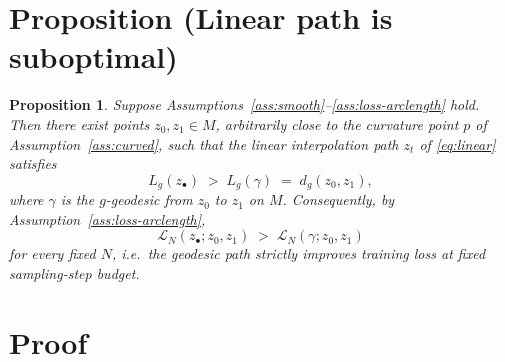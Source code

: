 \documentclass[11pt]{article}
\newtheorem{proposition}{Proposition}
\begin{document}
\section*{Proposition (Linear path is suboptimal)}

\begin{proposition}\label{prop:main}
Suppose Assumptions~\ref{ass:smooth}--\ref{ass:loss-arclength} hold.
Then there exist points $z_0, z_1 \in M$, arbitrarily close to the
curvature point $p$ of Assumption~\ref{ass:curved}, such that the
linear interpolation path $z_t$ of \eqref{eq:linear} satisfies
\begin{equation}\label{eq:strict-arc}
  L_g(z_\bullet) \;>\; L_g(\gamma) \;=\; d_g(z_0, z_1),
\end{equation}
where $\gamma$ is the $g$-geodesic from $z_0$ to $z_1$ on $M$.
Consequently, by Assumption~\ref{ass:loss-arclength},
\begin{equation}\label{eq:strict-loss}
  \mathcal{L}_N(z_\bullet; z_0, z_1) \;>\; \mathcal{L}_N(\gamma; z_0, z_1)
\end{equation}
for every fixed $N$, i.e.\ the geodesic path strictly improves
training loss at fixed sampling-step budget.
\end{proposition}

\section*{Proof}
\end{document}
